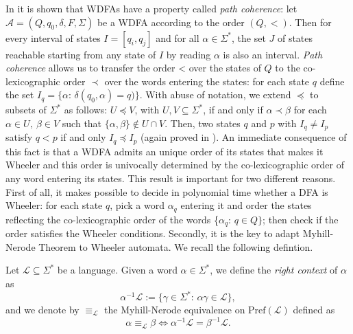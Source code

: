 \documentclass[runningheads]{llncs}
\newcommand{\pf}[1]{\text{Pref}(\mathcal #1)}
\begin{document}
In \cite{Gagie} it is shown that WDFAs have a property called \emph{path coherence}: let $\mathcal A = (Q,q_0,\delta,F,\Sigma)$ be a WDFA according to the order $(Q,<)$. 
Then for every interval of states $I=[q_i, q_j]$ and for all $\alpha \in \Sigma^*$, the set $J$ of states reachable starting from any state of $I$ by reading $\alpha$ is also an interval.
\emph{Path coherence} allows us to transfer the order < over the states of $Q$ to the co-lexicographic order $\prec$ over the words entering the states: for each state $q$ define the set $I_q = \{\alpha:\,\delta(q_0,\alpha)=q)\}$. 
With abuse of notation, we extend $\preceq$ to subsets of $\Sigma^*$ as follows: $U \preceq V$, with $U,V \subseteq \Sigma^*$, if and only if $\alpha\prec \beta$ for each $\alpha\in U,\ \beta\in V$ such that $\{\alpha,\beta\} \notin U \cap V$.
Then, two states $q$ and $p$ with $I_q \ne I_p$ satisfy $q < p$ if and only $I_q \preceq I_p$ (again proved in \cite{ADPP}).
An immediate consequence of this fact is that a WDFA admits an unique order of its states that makes it Wheeler and this order is univocally determined by the co-lexicographic order of any word entering its states.
This result is important for two different reasons. First of all, it makes possible to decide in polynomial time whether a DFA is Wheeler: for each state $q$, pick a word $\alpha_q$ entering it and order the states reflecting the co-lexicographic order of the words \{$\alpha_q:\, q \in Q\}$; then check if the order satisfies the Wheeler conditions. 
Secondly, it is the key to adapt Myhill-Nerode Theorem to Wheeler automata. We recall the following defintion.

\begin{definition}
\label{equivL}
Let $\mathcal L \subseteq \Sigma^*$ be a language. Given a word $\alpha \in \Sigma^*$, we define the \emph{right context} of $\alpha$ as  
\[
\alpha^{-1}\mathcal L := \{\gamma \in \Sigma^*:\, \alpha\gamma \in \mathcal L\},
\]
and we denote by $\equiv_\mathcal L$ the Myhill-Nerode equivalence on $\pf L$ defined as
\[
\alpha \equiv_\mathcal L \beta \iff \alpha^{-1}\mathcal L = \beta^{-1}\mathcal L.
\]
\end{definition}
\end{document}
